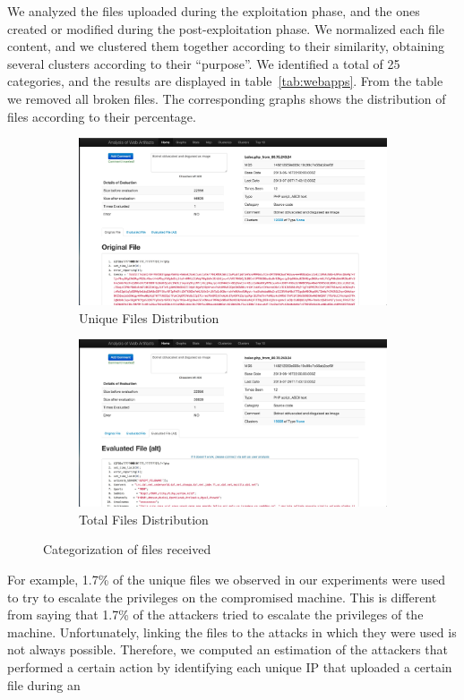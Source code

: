 We analyzed the files uploaded during the exploitation phase, and the ones created or modified during the post-exploitation phase. We normalized each file content, and we clustered them together according to their similarity, obtaining several clusters according to their ``purpose''. We identified a total of 25 categories, and the results are displayed in table~\ref{tab:webapps}. From the table we removed all broken files. The corresponding graphs shows the distribution of files according to their percentage.

\begin{figure}
\centering
\begin{subfigure}{.5\textwidth}
  \centering
  \includegraphics[width=1.0\linewidth]{Images/obf_file.jpg}
  \caption{Unique Files Distribution}
  \label{fig:sub1}
\end{subfigure}%
\begin{subfigure}{.5\textwidth}
  \centering
  \includegraphics[width=1.0\linewidth]{Images/deobf_file.jpg}
  \caption{Total Files Distribution}
  \label{fig:sub2}
\end{subfigure}
\caption{Categorization of files received}
\label{fig:test}
\end{figure}

For example, 1.7\% of the unique files we observed in our experiments were used to try to escalate the privileges on the compromised machine. This is different from saying that 1.7\% of the attackers tried to escalate the privileges of the machine. Unfortunately, linking the files to the attacks in which they were used is not always possible. Therefore, we computed an estimation of the attackers that performed a certain action by identifying each unique IP that uploaded a certain file during an
